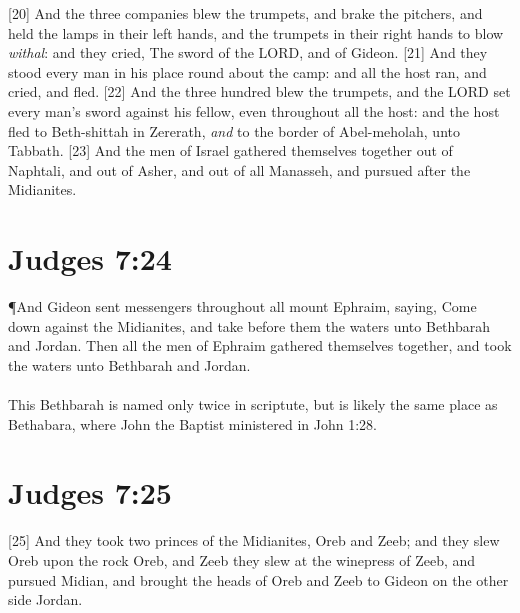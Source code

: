 [20] \textcolor[rgb]{0.00,0.00,1.00}{And the three companies blew the trumpets, and brake the pitchers, and held the lamps in their left hands, and the trumpets in their right hands to blow \emph{withal}: and they cried, The sword of the LORD, and of Gideon.}
[21] \textcolor[rgb]{0.00,0.00,1.00}{And they stood every man in his place round about the camp: and all the host ran, and cried, and fled.}
[22] \textcolor[rgb]{0.00,0.00,1.00}{And the three hundred blew the trumpets, and the LORD set every man's sword against his fellow, even throughout all the host: and the host fled to Beth-shittah in Zererath, \emph{and} to the border of Abel-meholah, unto Tabbath.}
[23] \textcolor[rgb]{0.00,0.00,1.00}{And the men of Israel gathered themselves together out of Naphtali, and out of Asher, and out of all Manasseh, and pursued after the Midianites.}
\section{Judges 7:24}
\P \textcolor[rgb]{0.00,0.00,1.00}{And Gideon sent messengers throughout all mount Ephraim, saying, Come down against the Midianites, and take before them the waters unto Bethbarah and Jordan. Then all the men of Ephraim gathered themselves together, and took the waters unto Bethbarah and Jordan.}\\
\\
This Bethbarah is named only twice in scriptute, but is likely the same place as Bethabara, where John the Baptist ministered in John 1:28.
\section{Judges 7:25}
 [25] \textcolor[rgb]{0.00,0.00,1.00}{And they took two princes of the Midianites, Oreb and Zeeb; and they slew Oreb upon the rock Oreb, and Zeeb they slew at the winepress of Zeeb, and pursued Midian, and brought the heads of Oreb and Zeeb to Gideon on the other side Jordan.}
\newpage
